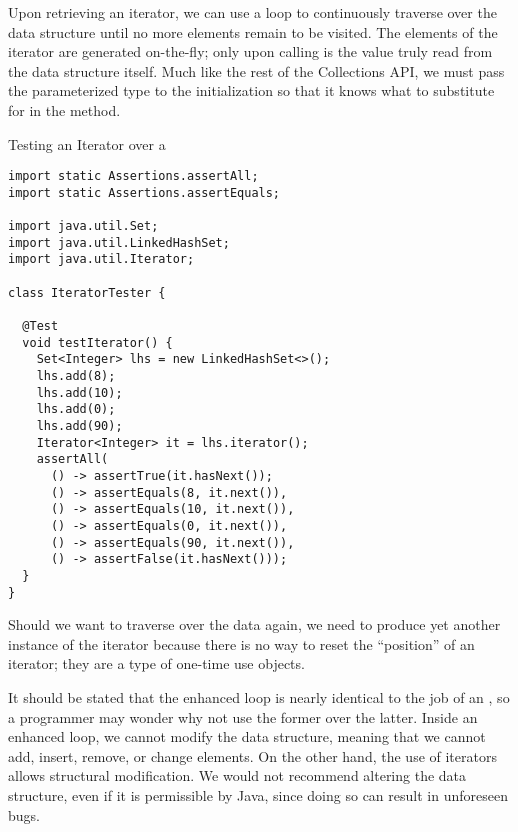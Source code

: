 Upon retrieving an iterator, we can use a  loop to continuously traverse over the data structure until no more elements remain to be visited. The elements of the iterator are generated on-the-fly; only upon calling  is the value truly read from the data structure itself. Much like the rest of the Collections API, we must pass the parameterized type to the  initialization so that it knows what to substitute for  in the  method.


\begin{cl}[]{Testing an Iterator over a }
\begin{lstlisting}[language=MyJava]
import static Assertions.assertAll;
import static Assertions.assertEquals;

import java.util.Set;
import java.util.LinkedHashSet;
import java.util.Iterator;

class IteratorTester {

  @Test
  void testIterator() {
    Set<Integer> lhs = new LinkedHashSet<>();
    lhs.add(8);
    lhs.add(10);
    lhs.add(0);
    lhs.add(90);
    Iterator<Integer> it = lhs.iterator();
    assertAll(
      () -> assertTrue(it.hasNext());
      () -> assertEquals(8, it.next()),
      () -> assertEquals(10, it.next()),
      () -> assertEquals(0, it.next()),
      () -> assertEquals(90, it.next()),
      () -> assertFalse(it.hasNext()));
  }
} 
\end{lstlisting}
\end{cl}

Should we want to traverse over the data again, we need to produce yet another instance of the iterator because there is no way to reset the ``position'' of an iterator; they are a type of one-time use objects.

It should be stated that the enhanced  loop is nearly identical to the job of an , so a programmer may wonder why not use the former over the latter. Inside an enhanced  loop, we cannot modify the data structure, meaning that we cannot add, insert, remove, or change elements. On the other hand, the use of iterators allows structural modification. We would not recommend altering the data structure, even if it is permissible by Java, since doing so can result in unforeseen bugs. 

